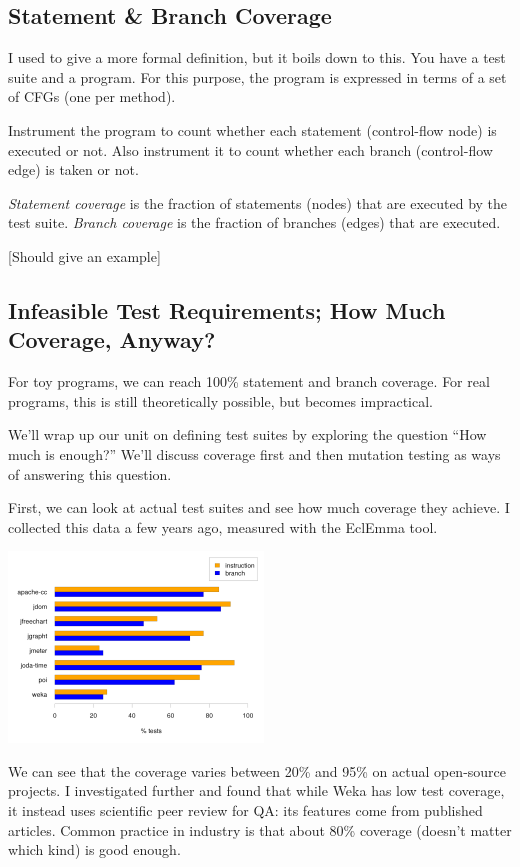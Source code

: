 \documentclass[11pt]{article}
\begin{document}
\subsection*{Statement \& Branch Coverage}

I used to give a more formal definition, but it boils down to this.
You have a test suite and a program. For this purpose, the program is
expressed in terms of a set of CFGs (one per method).

Instrument the program to count whether each statement (control-flow
node) is executed or not.  Also instrument it to count whether each
branch (control-flow edge) is taken or not.

\emph{Statement coverage} is the fraction of statements (nodes) that are
executed by the test suite. \emph{Branch coverage} is the fraction of branches (edges)
that are executed.

[Should give an example]


\subsection*{Infeasible Test Requirements; How Much Coverage, Anyway?}

For toy programs, we can reach 100\% statement and branch coverage.
For real programs, this is still theoretically possible, but becomes
impractical. 

We'll wrap up our unit on defining test suites by exploring the question
``How much is enough?'' We'll discuss coverage first and then mutation testing
as ways of answering this question.

First, we can look at actual test suites and see how much coverage they achieve.
I collected this data a few years ago, measured with the EclEmma tool.

\begin{center}
  \includegraphics[height=2in]{L03/coverage.png}
\end{center}

We can see that the coverage varies between 20\% and 95\% on actual
open-source projects. I investigated further and found that while Weka has low
test coverage, it instead uses scientific peer review for QA: its features
come from published articles. Common practice in industry is that about 80\%
coverage (doesn't matter which kind) is good enough.
\end{document}
